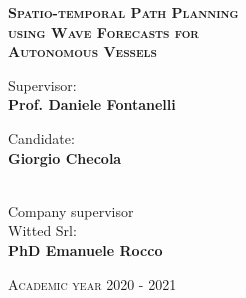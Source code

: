 \begin{titlepage}
\begin{center}
	{\LARGE
		\textbf{\textsc{Spatio-temporal Path Planning \\ using Wave Forecasts for \\ Autonomous Vessels\\}}}
	
	\vspace{2.5cm}
	\begin{minipage}[t]{0.34\textwidth}
		\begin{flushleft}
			{\large Supervisor:} \\ \textbf{Prof. Daniele Fontanelli}
		\end{flushleft}
	\end{minipage}
	\begin{minipage}[t]{0.64\textwidth}
		\begin{flushright}
			{\large Candidate:} \\ \textbf{Giorgio Checola}
			
		\end{flushright}
	\end{minipage}\\
	\vspace{4cm}
	{\large Company supervisor\\ Witted Srl:}\\
	\textbf{PhD Emanuele Rocco}
	\vfill
	\vspace{0.3cm}
	\noindent\hrulefill
	\vspace{0.3cm}
	\large
	
	\textsc{Academic year {2020 - 2021}}
\end{center}
\end{titlepage}


